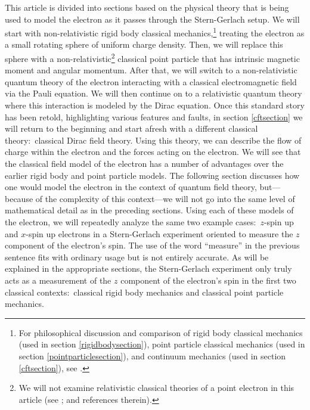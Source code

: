 \documentclass[onecolumn,secnumarabic,amsmath,amssymb,balancelastpage,nofootinbib]{article}
\begin{document}
This article is divided into sections based on the physical theory that is being used to model the electron as it passes through the Stern-Gerlach setup.  We will start with non-relativistic rigid body classical mechanics,\footnote{For philosophical discussion and comparison of rigid body classical mechanics (used in section \ref{rigidbodysection}), point particle classical mechanics (used in section \ref{pointparticlesection}), and continuum mechanics (used in section \ref{cftsection}), see \citet{wilson1998, wilson2013}.} treating the electron as a small rotating sphere of uniform charge density.  Then, we will replace this sphere with a non-relativistic\footnote{We will not examine relativistic classical theories of a point electron in this article (see \citealp{wen2016}; \citealp{barandes2019long, barandes2019short} and references therein).} classical point particle that has intrinsic magnetic moment and angular momentum.  After that, we will switch to a non-relativistic quantum theory of the electron interacting with a classical electromagnetic field via the Pauli equation.  We will then continue on to a relativistic quantum theory where this interaction is modeled by the Dirac equation.  Once this standard story has been retold, highlighting various features and faults, in section \ref{cftsection} we will return to the beginning and start afresh with a different classical theory:\ classical Dirac field theory.  Using this theory, we can describe the flow of charge within the electron and the forces acting on the electron.  We will see that the classical field model of the electron has a number of advantages over the earlier rigid body and point particle models.  The following section discusses how one would model the electron in the context of quantum field theory, but---because of the complexity of this context---we will not go into the same level of mathematical detail as in the preceding sections.  Using each of these models of the electron, we will repeatedly analyze the same two example cases:\ $z$-spin up and $x$-spin up electrons in a Stern-Gerlach experiment oriented to measure the $z$ component of the electron's spin.  The use of the word ``measure'' in the previous sentence fits with ordinary usage but is not entirely accurate.  As will be explained in the appropriate sections, the Stern-Gerlach experiment only truly acts as a measurement of the $z$ component of the electron's spin in the first two classical contexts:\ classical rigid body mechanics and classical point particle mechanics.
\end{document}
